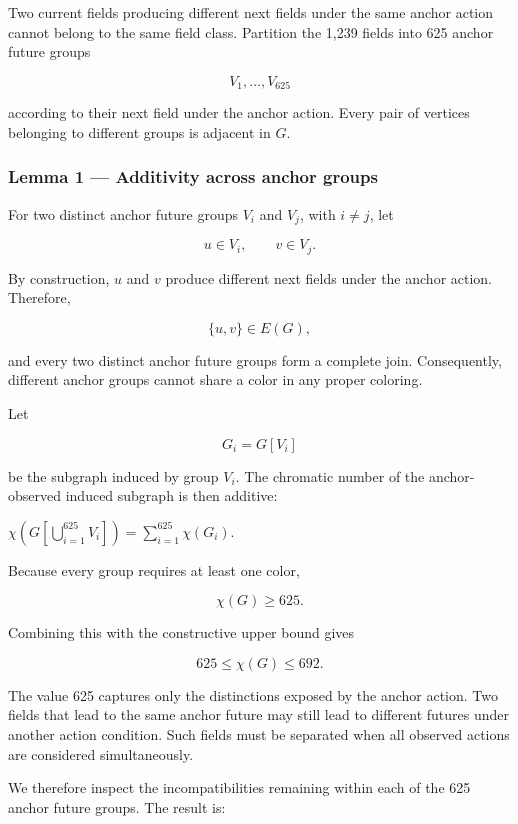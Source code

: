 \documentclass[
  11pt,
]{article}
\begin{document}
Two current fields producing different next fields under the same anchor
action cannot belong to the same field class. Partition the 1,239 fields
into 625 anchor future groups

\[{V_1,\ldots,V_{625}}\]

according to their next field under the anchor action. Every pair of
vertices belonging to different groups is adjacent in \({G}\).

\hypertarget{lemma-1-additivity-across-anchor-groups}{%
\subsubsection{Lemma 1 --- Additivity across anchor
groups}\label{lemma-1-additivity-across-anchor-groups}}

For two distinct anchor future groups \({V_i}\) and \({V_j}\), with
\({i\neq j}\), let

\[{u\in V_i,\qquad v\in V_j.}\]

By construction, \({u}\) and \({v}\) produce different next fields under
the anchor action. Therefore,

\[{\lbrace u,v\rbrace\in E(G),}\]

and every two distinct anchor future groups form a complete join.
Consequently, different anchor groups cannot share a color in any proper
coloring.

Let

\[{G_i=G[V_i]}\]

be the subgraph induced by group \({V_i}\). The chromatic number of the
anchor-observed induced subgraph is then additive:

\({\chi\!\left(G\!\left[\bigcup_{i=1}^{625}V_i\right]\right) =\sum_{i=1}^{625}\chi(G_i).}\)

Because every group requires at least one color,

\[{\chi(G)\ge625.}\]

Combining this with the constructive upper bound gives

\[{\boxed{625\le\chi(G)\le692}.}\]

The value 625 captures only the distinctions exposed by the anchor
action. Two fields that lead to the same anchor future may still lead to
different futures under another action condition. Such fields must be
separated when all observed actions are considered simultaneously.

We therefore inspect the incompatibilities remaining within each of the
625 anchor future groups. The result is:
\end{document}
